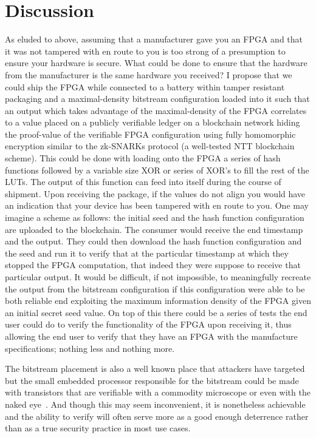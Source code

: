 \documentclass[conference]{IEEEtran}
\begin{document}
\section{Discussion}
As eluded to above, assuming that a manufacturer gave you an FPGA and that it was not tampered with en route to you is too strong of a presumption to ensure your hardware is secure. What could be done to ensure that the hardware from the manufacturer is the same hardware you received? I propose that we could ship the FPGA while connected to a battery within tamper resistant packaging and a maximal-density bitstream configuration loaded into it such that an output which takes advantage of the maximal-density of the FPGA correlates to a value placed on a publicly verifiable ledger on a blockchain network hiding the proof-value of the verifiable FPGA configuration using fully homomorphic encryption similar to the zk-SNARKs protocol (a well-tested NTT blockchain scheme). This could be done with loading onto the FPGA a series of hash functions followed by a variable size XOR or series of XOR's to fill the rest of the LUTs. The output of this function can feed into itself during the course of shipment. Upon receiving the package, if the values do not align you would have an indication that your device has been tampered with en route to you. One may imagine a scheme as follows: the initial seed and the hash function configuration are uploaded to the blockchain. The consumer would receive the end timestamp and the output. They could then download the hash function configuration and the seed and run it to verify that at the particular timestamp at which they stopped the FPGA computation, that indeed they were suppose to receive that particular output.  It would be difficult, if not impossible, to meaningfully recreate the output from the bitstream configuration if this configuration were able to be both reliable end exploiting the maximum information density of the FPGA given an initial secret seed value. On top of this there could be a series of tests the end user could do to verify the functionality of the FPGA upon receiving it, thus allowing the end user to verify that they have an FPGA with the manufacture specifications; nothing less and nothing more.

The bitstream placement is also a well known place that attackers have targeted~\cite{swierczynski} but the small embedded processor responsible for the bitstream could be made with transistors that are verifiable with a commodity microscope or even with the naked eye~\cite{monster}. And though this may seem inconvenient, it is nonetheless achievable and the ability to verify will often serve more as a good enough deterrence rather than as a true security practice in most use cases.
\end{document}
